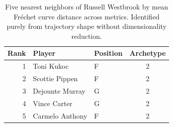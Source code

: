 \begin{table}[htbp]
  \centering\small
  \begin{tabular}{rllc}
    \toprule
    Rank & Player & Position & Archetype \\
    \midrule
    1 & Toni Kukoc & F & 2 \\
    2 & Scottie Pippen & F & 2 \\
    3 & Dejounte Murray & G & 2 \\
    4 & Vince Carter & G & 2 \\
    5 & Carmelo Anthony & F & 2 \\
    \bottomrule
  \end{tabular}
  \caption{Five nearest neighbors of Russell Westbrook by mean Fr\'{e}chet curve distance across metrics. Identified purely from trajectory shape without dimensionality reduction.}
  \label{tab:Russell_Westbrook_frechet_curve_neighbors}
\end{table}

